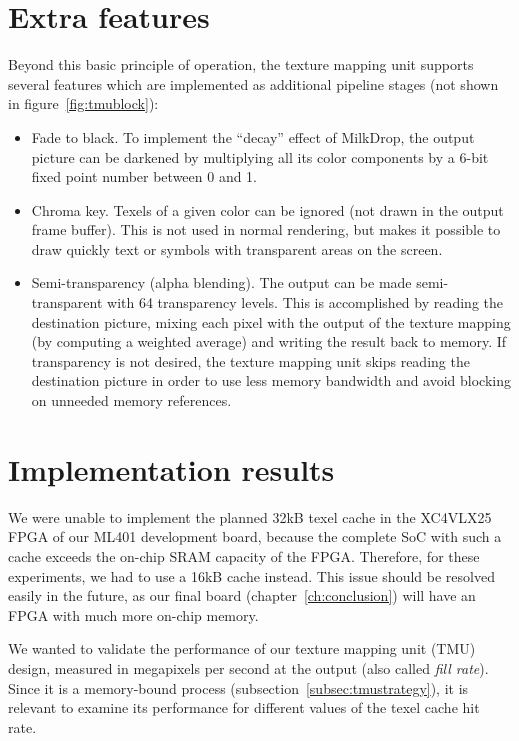 \documentclass[a4paper,11pt]{kthesis}
\begin{document}
\section{Extra features}
Beyond this basic principle of operation, the texture mapping unit supports several features which are implemented as additional pipeline stages (not shown in figure~\ref{fig:tmublock}):
\begin{itemize}
\item Fade to black. To implement the ``decay'' effect of MilkDrop, the output picture can be darkened by multiplying all its color components by a 6-bit fixed point number between 0 and 1.
\item Chroma key. Texels of a given color can be ignored (not drawn in the output frame buffer). This is not used in normal rendering, but makes it possible to draw quickly text or symbols with transparent areas on the screen.
\item Semi-transparency (alpha blending). The output can be made semi-transparent with 64 transparency levels. This is accomplished by reading the destination picture, mixing each pixel with the output of the texture mapping (by computing a weighted average) and writing the result back to memory. If transparency is not desired, the texture mapping unit skips reading the destination picture in order to use less memory bandwidth and avoid blocking on unneeded memory references.
\end{itemize}

\section{Implementation results}
We were unable to implement the planned 32kB texel cache in the XC4VLX25 FPGA of our ML401 development board, because the complete SoC with such a cache exceeds the on-chip SRAM capacity of the FPGA. Therefore, for these experiments, we had to use a 16kB cache instead. This issue should be resolved easily in the future, as our final board (chapter~\ref{ch:conclusion}) will have an FPGA with much more on-chip memory.

We wanted to validate the performance of our texture mapping unit (TMU) design, measured in megapixels per second at the output (also called \textit{fill rate}). Since it is a memory-bound process (subsection~\ref{subsec:tmustrategy}), it is relevant to examine its performance for different values of the texel cache hit rate.
\end{document}
